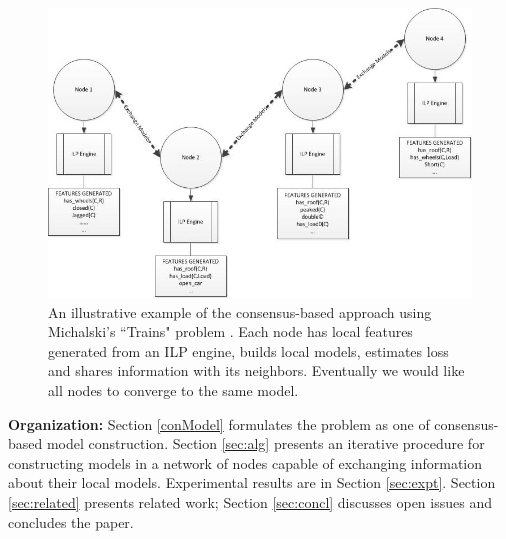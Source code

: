 %

\begin{figure}[htb]
\centerline{\includegraphics[height=0.50\textheight]{ilp_dfe.jpg}}
\caption{An illustrative example of the consensus-based approach using Michalski's ``Trains" problem .
Each node has local features generated from an ILP engine, builds local models, estimates loss and shares
information with its neighbors. Eventually we would like all nodes to converge to the same model.}
\label{illEx}
\end{figure}





\noindent \textbf{Organization: } 
Section \ref{conModel} formulates the problem as one of consensus-based model construction. Section \ref{sec:alg}
presents an iterative procedure for constructing models in a network of nodes capable
of exchanging information about their local models. Experimental
results are in Section \ref{sec:expt}. Section \ref{sec:related} presents related work; Section \ref{sec:concl} discusses open
issues and concludes the paper.

